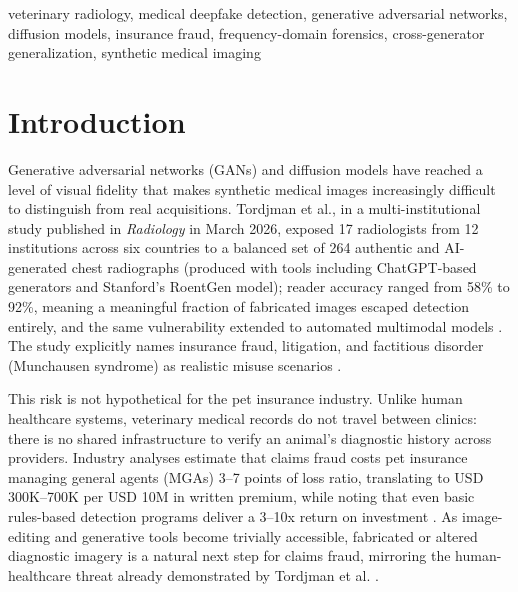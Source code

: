 \documentclass[journal]{IEEEtran}
\begin{document}
\begin{IEEEkeywords}
veterinary radiology, medical deepfake detection, generative adversarial networks, diffusion models, insurance fraud, frequency-domain forensics, cross-generator generalization, synthetic medical imaging
\end{IEEEkeywords}

\section{Introduction}
\label{sec:intro}

Generative adversarial networks (GANs) and diffusion models have reached a level of visual fidelity that makes synthetic medical images increasingly difficult to distinguish from real acquisitions. Tordjman et al., in a multi-institutional study published in \textit{Radiology} in March 2026, exposed 17 radiologists from 12 institutions across six countries to a balanced set of 264 authentic and AI-generated chest radiographs (produced with tools including ChatGPT-based generators and Stanford's RoentGen model); reader accuracy ranged from 58\% to 92\%, meaning a meaningful fraction of fabricated images escaped detection entirely, and the same vulnerability extended to automated multimodal models \cite{rsna_deepfake_xray_2026}. The study explicitly names insurance fraud, litigation, and factitious disorder (Munchausen syndrome) as realistic misuse scenarios \cite{rsna_deepfake_xray_2026}.

This risk is not hypothetical for the pet insurance industry. Unlike human healthcare systems, veterinary medical records do not travel between clinics: there is no shared infrastructure to verify an animal's diagnostic history across providers. Industry analyses estimate that claims fraud costs pet insurance managing general agents (MGAs) 3--7 points of loss ratio, translating to USD 300K--700K per USD 10M in written premium, while noting that even basic rules-based detection programs deliver a 3--10x return on investment \cite{insurnest_fraud_2026}. As image-editing and generative tools become trivially accessible, fabricated or altered diagnostic imagery is a natural next step for claims fraud, mirroring the human-healthcare threat already demonstrated by Tordjman et al. \cite{rsna_deepfake_xray_2026}.
\end{document}
